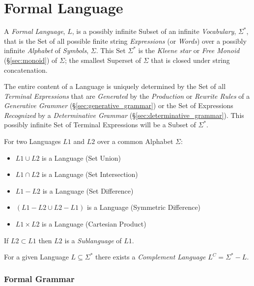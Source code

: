 \part{Formal Language}\label{sec:formal_language} \cite{hammel03}

A \emph{Formal Language}, $L$, is a possibly infinite Subset of an
infinite \emph{Vocabulary}, $\Sigma^*$, that is the Set of all
possible finite string \emph{Expressions} (or \emph{Words}) over a
possibly infinite \emph{Alphabet} of \emph{Symbols}, $\Sigma$. This
Set $\Sigma^*$ is the \emph{Kleene star} or \emph{Free Monoid}
(\S\ref{sec:monoid}) of $\Sigma$; the smallest Superset of $\Sigma$
that is closed under string concatenation.

The entire content of a Language is uniquely determined by the Set of
all \emph{Terminal Expressions} that are \emph{Generated} by the
\emph{Production} or \emph{Rewrite Rules} of a \emph{Generative
  Grammer} (\S\ref{sec:generative_grammar}) or the Set of
Expressions \emph{Recognized} by a \emph{Determinative Grammar}
(\S\ref{sec:determinative_grammar}). This possibly infinite Set of
Terminal Expressions will be a Subset of $\Sigma^*$.

For two Languages $L1$ and $L2$ over a common Alphabet $\Sigma$:
\begin{itemize}
    \item $L1 \cup L2$ is a Language (Set Union)
    \item $L1 \cap L2$ is a Language (Set Intersection)
    \item $L1 - L2$ is a Language (Set Difference)
    \item $(L1 - L2 \cup L2 - L1)$ is a Language (Symmetric Difference)
    \item $L1 \times L2$ is a Language (Cartesian Product)
\end{itemize}
If $L2 \subset L1$ then $L2$ is a \emph{Sublanguage} of $L1$.

For a given Language $L \subseteq \Sigma^*$ there exists a
\emph{Complement Language} $L^C = \Sigma^* - L$.



\section{Formal Grammar}\label{sec:formal_grammar}


